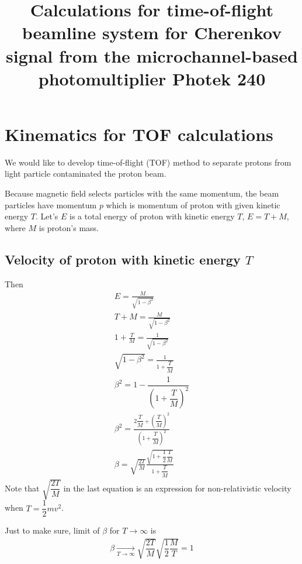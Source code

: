 \documentclass[english]{article}
\begin{document}
\title{Calculations for time-of-flight beamline system for Cherenkov signal from the microchannel-based photomultiplier Photek 240}

\maketitle

\section{Kinematics for TOF calculations}

We would like to develop time-of-flight (TOF) method to separate protons from light particle contaminated the proton beam. 

Because magnetic field selects particles with the same momentum, 
the beam particles have momentum $p$ which is momentum of proton with given kinetic energy $T$. 
Let's $E$ is a total energy of proton with kinetic energy $T$, $E = T+M$, where $M$ is proton's mass. 

\subsection{Velocity of proton with kinetic energy $T$}

Then 
\begin{align*}
E = \frac{M}{\sqrt{1-\beta^2}} \\
T+M = \frac{M}{\sqrt{1-\beta^2}} \\
1 + \frac{T}{M} = \frac{1}{\sqrt{1-\beta^2}} \\
\sqrt{1-\beta^2} = \frac{1}{1 + \dfrac{T}{M}} \\
\beta^2 = 1 - \dfrac{1}{\left(1+\dfrac{T}{M}\right)^2} \\ 
\beta^2 = \frac{2\dfrac{T}{M} + \left(\dfrac{T}{M}\right)^2}{\left(1+\dfrac{T}{M}\right)^2} \\
\beta = \sqrt{\frac{2T}{M}} \frac{\sqrt{1 + \dfrac{1}{2}\dfrac{T}{M}}}{1+\dfrac{T}{M}}
\end{align*}
Note that $\sqrt{\dfrac{2T}{M}}$ in the last equation is an expression for non-relativistic velocity when $T = \dfrac{1}{2}mv^2$. 

Just to make sure, limit of $\beta$ for $T \rightarrow \infty$ is 
\begin{align*}
\beta \underset{T \rightarrow \infty}{\longrightarrow} 
\sqrt{\dfrac{2T}{M}} \sqrt{\dfrac{1}{2}\dfrac{M}{T}} = 1
\end{align*}
\end{document}
